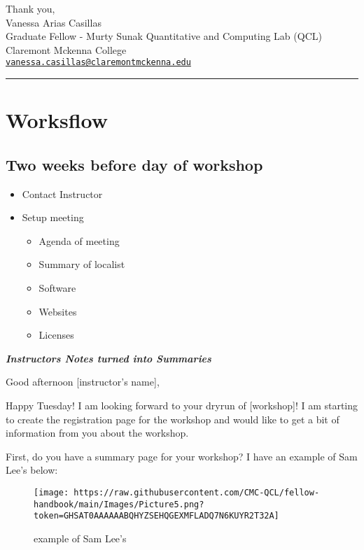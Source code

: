 \documentclass[
]{book}
\providecommand{\tightlist}{%
  \setlength{\itemsep}{0pt}\setlength{\parskip}{0pt}}
\begin{document}
Thank you,\\
Vanessa Arias Casillas\\
Graduate Fellow - Murty Sunak Quantitative and Computing Lab (QCL)\\
Claremont Mckenna College\\
\href{mailto:vanessa.casillas@claremontmckenna.edu}{\nolinkurl{vanessa.casillas@claremontmckenna.edu}}

\begin{center}\rule{0.5\linewidth}{0.5pt}\end{center}

\hypertarget{worksflow}{%
\section{Worksflow}\label{worksflow}}

\hypertarget{two-weeks-before-day-of-workshop}{%
\subsection{Two weeks before day of workshop}\label{two-weeks-before-day-of-workshop}}

\begin{itemize}
\tightlist
\item
  Contact Instructor\\
\item
  Setup meeting

  \begin{itemize}
  \tightlist
  \item
    Agenda of meeting
  \item
    Summary of localist
  \item
    Software
  \item
    Websites
  \item
    Licenses
  \end{itemize}
\end{itemize}

\textbf{\emph{Instructors Notes turned into Summaries}}

Good afternoon {[}instructor's name{]},

Happy Tuesday! I am looking forward to your dryrun of {[}workshop{]}! I am starting to create the registration page for the workshop and would like to get a bit of information from you about the workshop.

First, do you have a summary page for your workshop? I have an example of Sam Lee's below:

\begin{figure}
\centering
\texttt{[image: https://raw.githubusercontent.com/CMC-QCL/fellow-handbook/main/Images/Picture5.png?token=GHSAT0AAAAAABQHYZSEHQGEXMFLADQ7N6KUYR2T32A]}
\caption{example of Sam Lee's}
\end{figure}
\end{document}

